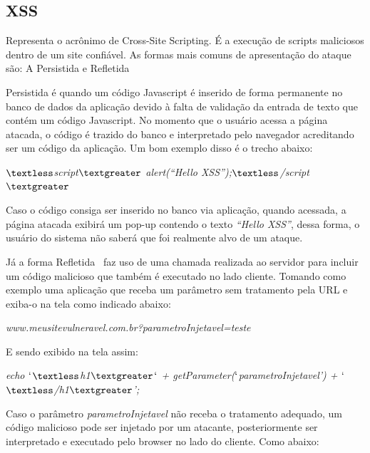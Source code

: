 \documentclass[
    12pt,               %
    openright,          %
    oneside,            %
    a4paper,            %
    section=TITLE,     %
    english,            %
    french,             %
    spanish,            %
    brazil              %
    ]{abntex2}
\newcommand{\citep}{\cite}
\begin{document}
\subsection{XSS}

Representa o acrônimo de Cross-Site Scripting. É a execução de scripts maliciosos dentro de um site confiável. As formas mais comuns de apresentação do ataque são: A Persistida e Refletida\citep{62231}


Persistida é quando um código Javascript é inserido de forma permanente no banco de dados da aplicação devido à falta de validação da entrada de texto que contém um código Javascript. No momento que o usuário acessa a página atacada, o código é trazido do banco e interpretado pelo navegador acreditando ser um código da aplicação. Um bom exemplo disso é o trecho abaixo:



\begin{center}
\emph{$\textless$script$\textgreater$ alert(\textquotedblleft{}Hello XSS\textquotedblright{});$\textless$/script$\textgreater$}
\end{center}


Caso o código consiga ser inserido no banco via aplicação, quando acessada, a página atacada exibirá um pop-up contendo o texto \emph{\textquotedblleft{}Hello XSS\textquotedblright{}}, dessa forma, o usuário do sistema não saberá que foi realmente alvo de um ataque.


Já a forma Refletida~ faz uso de uma chamada realizada ao servidor para incluir um código malicioso que também é executado no lado cliente. Tomando como exemplo uma aplicação que receba um parâmetro sem tratamento pela URL e exiba-o na tela como indicado abaixo:






\begin{center}
\emph{www.meusitevulneravel.com.br?parametroInjetavel=teste}
\end{center}


E sendo exibido na tela assim:



\begin{center}
\emph{echo $\lq$$\textless$h1$\textgreater$$\lq$ + getParameter($\lq$parametroInjetavel\rq{}) + $\lq$$\textless$/h1$\textgreater$';}
\end{center}


Caso o parâmetro \emph{parametroInjetavel} não receba o tratamento adequado, um código malicioso pode ser injetado por um atacante, posteriormente ser interpretado e executado pelo browser no lado do cliente. Como abaixo:
\end{document}
